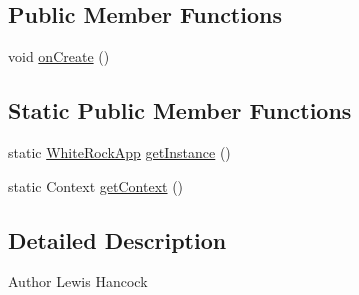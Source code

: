 \subsection*{Public Member Functions}
\begin{DoxyCompactItemize}
\item 
void \hyperlink{classuk_1_1ac_1_1swan_1_1digitaltrails_1_1utils_1_1_white_rock_app_ad27bd8dfd984fdeaa0caa3763a290320}{on\+Create} ()
\end{DoxyCompactItemize}
\subsection*{Static Public Member Functions}
\begin{DoxyCompactItemize}
\item 
static \hyperlink{classuk_1_1ac_1_1swan_1_1digitaltrails_1_1utils_1_1_white_rock_app}{White\+Rock\+App} \hyperlink{classuk_1_1ac_1_1swan_1_1digitaltrails_1_1utils_1_1_white_rock_app_ae787ad1d6d5634b32408a6e013fef3f4}{get\+Instance} ()
\item 
static Context \hyperlink{classuk_1_1ac_1_1swan_1_1digitaltrails_1_1utils_1_1_white_rock_app_a1fb9114242141ed1bf402d8c19770f52}{get\+Context} ()
\end{DoxyCompactItemize}


\subsection{Detailed Description}
\begin{DoxyAuthor}{Author}
Lewis Hancock 
\end{DoxyAuthor}


